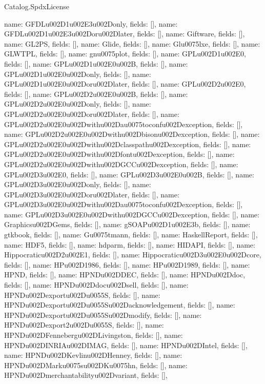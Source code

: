 \begin{lexlean}{Catalog.SpdxLicense}
\begin{semanticmodule}
{    {name: GFDLu002D1u002E3u002Donly, fields: []},
    {name: GFDLu002D1u002E3u002Doru002Dlater, fields: []},
    {name: Giftware, fields: []},
    {name: GL2PS, fields: []},
    {name: Glide, fields: []},
    {name: Glu0075lxe, fields: []},
    {name: GLWTPL, fields: []},
    {name: gnu0075plot, fields: []},
    {name: GPLu002D1u002E0, fields: []},
    {name: GPLu002D1u002E0u002B, fields: []},
    {name: GPLu002D1u002E0u002Donly, fields: []},
    {name: GPLu002D1u002E0u002Doru002Dlater, fields: []},
    {name: GPLu002D2u002E0, fields: []},
    {name: GPLu002D2u002E0u002B, fields: []},
    {name: GPLu002D2u002E0u002Donly, fields: []},
    {name: GPLu002D2u002E0u002Doru002Dlater, fields: []},
    {name: GPLu002D2u002E0u002Dwithu002Dau0075toconfu002Dexception, fields: []},
    {name: GPLu002D2u002E0u002Dwithu002Dbisonu002Dexception, fields: []},
    {name: GPLu002D2u002E0u002Dwithu002Dclasspathu002Dexception, fields: []},
    {name: GPLu002D2u002E0u002Dwithu002Dfontu002Dexception, fields: []},
    {name: GPLu002D2u002E0u002Dwithu002DGCCu002Dexception, fields: []},
    {name: GPLu002D3u002E0, fields: []},
    {name: GPLu002D3u002E0u002B, fields: []},
    {name: GPLu002D3u002E0u002Donly, fields: []},
    {name: GPLu002D3u002E0u002Doru002Dlater, fields: []},
    {name: GPLu002D3u002E0u002Dwithu002Dau0075toconfu002Dexception, fields: []},
    {name: GPLu002D3u002E0u002Dwithu002DGCCu002Dexception, fields: []},
    {name: Graphicsu002DGems, fields: []},
    {name: gSOAPu002D1u002E3b, fields: []},
    {name: gtkbook, fields: []},
    {name: Gu0075tmann, fields: []},
    {name: HaskellReport, fields: []},
    {name: HDF5, fields: []},
    {name: hdparm, fields: []},
    {name: HIDAPI, fields: []},
    {name: Hippocraticu002D2u002E1, fields: []},
    {name: Hippocraticu002D3u002E0u002Dcore, fields: []},
    {name: HPu002D1986, fields: []},
    {name: HPu002D1989, fields: []},
    {name: HPND, fields: []},
    {name: HPNDu002DDEC, fields: []},
    {name: HPNDu002Ddoc, fields: []},
    {name: HPNDu002Ddocu002Dsell, fields: []},
    {name: HPNDu002Dexportu002Du0055S, fields: []},
    {name: HPNDu002Dexportu002Du0055Su002Dacknowledgement, fields: []},
    {name: HPNDu002Dexportu002Du0055Su002Dmodify, fields: []},
    {name: HPNDu002Dexport2u002Du0055S, fields: []},
    {name: HPNDu002DFennebergu002DLivingston, fields: []},
    {name: HPNDu002DINRIAu002DIMAG, fields: []},
    {name: HPNDu002DIntel, fields: []},
    {name: HPNDu002DKevlinu002DHenney, fields: []},
    {name: HPNDu002DMarku0075su002DKu0075hn, fields: []},
    {name: HPNDu002Dmerchantabilityu002Dvariant, fields: []},
}
\end{semanticmodule}
\end{lexlean}
